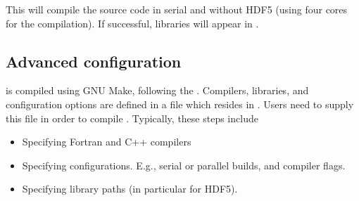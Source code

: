 \documentclass[letterpaper,10pt,english]{sphinxmanual}
\begin{document}
\sphinxAtStartPar
This will compile the  source code in serial and without HDF5 (using four cores for the compilation).
If successful,  libraries will appear in .


\subsection{Advanced configuration}
\label{\detokenize{Base/Installation:advanced-configuration}}
\sphinxAtStartPar
{} is compiled using GNU Make, following the .
Compilers, libraries, and configuration options are defined in a file  which resides in .
Users need to supply this file in order to compile .
Typically, these steps include
\begin{itemize}
\item {} 
\sphinxAtStartPar
Specifying Fortran and C++ compilers

\item {} 
\sphinxAtStartPar
Specifying configurations. E.g., serial or parallel builds, and compiler flags.

\item {} 
\sphinxAtStartPar
Specifying library paths (in particular for HDF5).

\end{itemize}
\end{document}

